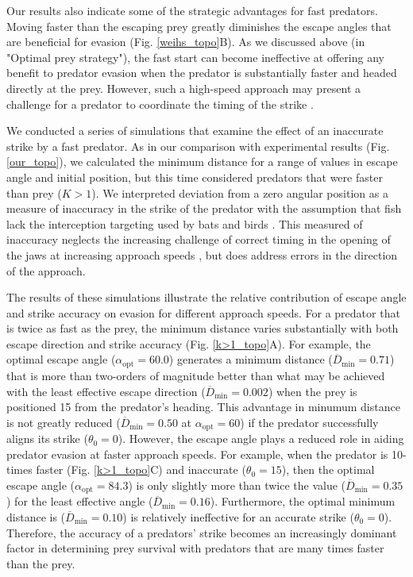 \documentclass[12pt]{article}
\newcommand{\ol}{\overline}
\begin{document}
Our results also indicate some of the strategic advantages for fast predators. Moving faster than the escaping prey greatly diminishes the escape angles that are beneficial for evasion (Fig. \ref{weihs_topo}B). 
As we discussed above (in "Optimal prey strategy"), the fast start can become ineffective at offering any benefit to predator evasion when the predator is substantially faster and headed directly at the prey. However, such a high-speed approach may present a challenge for a predator to coordinate the timing of the strike \citep{Higham:2007go, Higham:2005iu}. 

We conducted a series of simulations that examine the effect of an inaccurate strike by a fast predator. As in our comparison with experimental results (Fig. \ref{our_topo}), we calculated the minimum distance for a range of values in escape angle and initial position, but this time considered predators that were faster than prey ($K>1$). 
We interpreted deviation from a zero angular position as a measure of inaccuracy in the strike of the predator with the assumption that fish lack the interception targeting used by bats \citep{Ghose:2006dk} and birds \citep{Kane:2014fs}. This measured of inaccuracy neglects the increasing challenge of correct timing in the opening of the jaws at increasing approach speeds \citep{Kane:2014bh,Kane:2011hz}, but does address errors in the direction of the approach.

The results of these simulations illustrate the relative contribution of escape angle and strike accuracy on evasion for different approach speeds. For a predator that is twice as fast as the prey, the minimum distance varies substantially with both escape direction and strike accuracy (Fig. \ref{k>1_topo}A). 
For example, the optimal escape angle ($\alpha_{\text{opt}}=60.0$\textdegree) generates a minimum distance ($\ol D_{\text{min}}=0.71$) that is more than two-orders of magnitude better than what may be achieved with the least effective escape direction ($\ol D_{\text{min}}=0.002$) when the prey is positioned 15\textdegree\hspace{0.5pt} from the predator's heading. 
This advantage in minumum distance is not greatly reduced ($\ol D_{\text{min}}=0.50$ at $\alpha_{\text{opt}}=60$\textdegree) if the predator successfully aligns its strike ($\theta_0=0$\textdegree). 
However, the escape angle plays a reduced role in aiding predator evasion at faster approach speeds. For example, when the predator is 10-times faster  (Fig. \ref{k>1_topo}C) and inaccurate ($\theta_0=15$\textdegree), then the optimal escape angle ($\alpha_{\text{opt}}=84.3$\textdegree) is only slightly more than twice the value ($\ol D_{\text{min}}=0.35$) for the least effective angle ($\ol D_{\text{min}}=0.16$). 
Furthermore, the optimal minimum distance is ($\ol D_{\text{min}}=0.10$) is relatively ineffective for an accurate strike ($\theta_0=0$\textdegree). 
Therefore, the accuracy of a predators' strike becomes an increasingly dominant factor in determining prey survival with predators that are many times faster than the prey.
\end{document}
